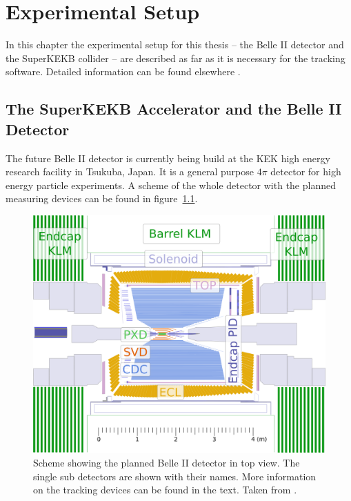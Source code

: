 \chapter{Experimental Setup} \label{chapter-ex}
In this chapter the experimental setup for this thesis -- the Belle II detector and the SuperKEKB collider -- are described as far as it is necessary for the tracking software. Detailed information can be found elsewhere \cite{tdr}.


\section{The SuperKEKB Accelerator and the Belle II Detector}

The future Belle II detector is currently being build at the KEK high energy research facility in Tsukuba, Japan. It is a general purpose $4\pi$ detector for high energy particle experiments. A scheme of the whole detector with the planned measuring devices can be found in figure~\ref{fig-belle2}.

\begin{figure}
 \centering
 \includegraphics[height=0.4\textheight]{figures/experimental_setup/detector_crossection_labels.pdf}
 \caption[Schema of the planned Belle II detector.]{Scheme showing the planned Belle II detector in top view. The single sub detectors are shown with their names. More information on the tracking devices can be found in the text. Taken from \cite{christian}.}
 \label{fig-belle2}
\end{figure}

